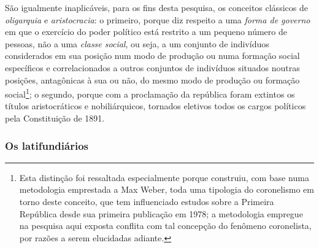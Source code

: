 São igualmente inaplicáveis, para os fins desta pesquisa, os conceitos clássicos de \textit{oligarquia} e \textit{aristocracia}: o primeiro, porque diz respeito a uma \textit{forma de governo} em que o exercício do poder político está restrito a um pequeno número de pessoas, não a uma \textit{classe social}, ou seja, a um conjunto de indivíduos considerados em sua posição num modo de produção ou numa formação social específicos e correlacionados a outros conjuntos de indivíduos situados noutras posições, antagônicas à sua ou não, do mesmo modo de produção ou formação social\footnote{Esta distinção foi ressaltada especialmente porque  construiu, com base numa metodologia emprestada a Max Weber, toda uma tipologia do coronelismo em torno deste conceito, que tem influenciado estudos sobre a Primeira República desde sua primeira publicação em 1978; a metodologia empregue na pesquisa aqui exposta conflita com tal concepção do fenômeno coronelista, por razões a serem elucidadas adiante.}; o segundo, porque com a proclamação da república foram extintos os títulos aristocráticos e nobiliárquicos, tornados eletivos todos os cargos políticos pela Constituição de 1891. 

\subsubsection{Os latifundiários}\label{subsubsec:clagraris}

